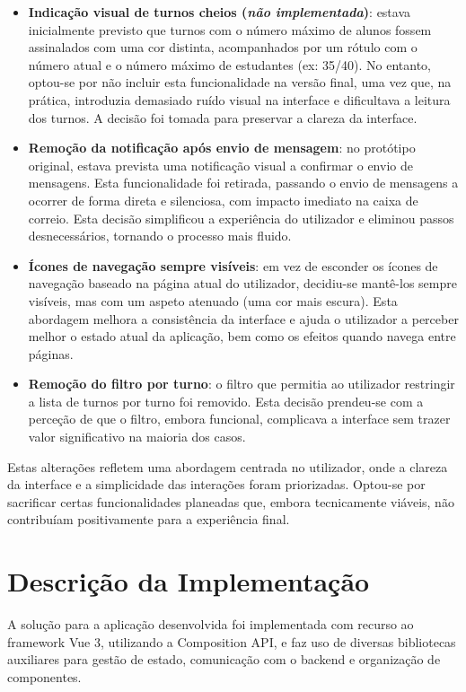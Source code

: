 \documentclass{article}
\begin{document}
\begin{itemize}
    \item \textbf{Indicação visual de turnos cheios (\textit{não implementada})}: estava inicialmente previsto que turnos com o número máximo de alunos fossem assinalados com uma cor distinta, acompanhados por um rótulo com o número atual e o número máximo de estudantes (ex: 35/40). No entanto, optou-se por não incluir esta funcionalidade na versão final, uma vez que, na prática, introduzia demasiado ruído visual na interface e dificultava a leitura dos turnos. A decisão foi tomada para preservar a clareza da interface.

    \item \textbf{Remoção da notificação após envio de mensagem}: no protótipo original, estava prevista uma notificação visual a confirmar o envio de mensagens. Esta funcionalidade foi retirada, passando o envio de mensagens a ocorrer de forma direta e silenciosa, com impacto imediato na caixa de correio. Esta decisão simplificou a experiência do utilizador e eliminou passos desnecessários, tornando o processo mais fluido.

    \item \textbf{Ícones de navegação sempre visíveis}: em vez de esconder os ícones de navegação baseado na página atual do utilizador, decidiu-se mantê-los sempre visíveis, mas com um aspeto atenuado (uma cor mais escura). Esta abordagem melhora a consistência da interface e ajuda o utilizador a perceber melhor o estado atual da aplicação, bem como os efeitos quando navega entre páginas.

    \item \textbf{Remoção do filtro por turno}: o filtro que permitia ao utilizador restringir a lista de turnos por turno foi removido. Esta decisão prendeu-se com a perceção de que o filtro, embora funcional, complicava a interface sem trazer valor significativo na maioria dos casos.
\end{itemize}
Estas alterações refletem uma abordagem centrada no utilizador, onde a clareza da interface e a simplicidade das interações foram priorizadas. Optou-se por sacrificar certas funcionalidades planeadas que, embora tecnicamente viáveis, não contribuíam positivamente para a experiência final.

\newpage
\section{Descrição da Implementação}
A solução para a aplicação desenvolvida foi implementada com recurso ao framework Vue 3, utilizando a Composition API, e faz uso de diversas bibliotecas auxiliares para gestão de estado, comunicação com o backend e organização de componentes.
\end{document}
